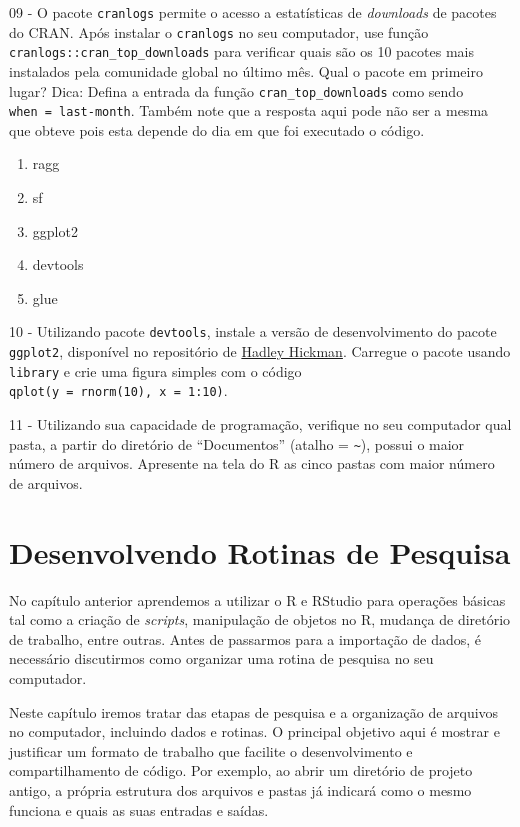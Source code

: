 \documentclass[
  11pt,
]{book}
\providecommand{\tightlist}{%
  \setlength{\itemsep}{0pt}\setlength{\parskip}{0pt}}
\begin{document}
09 -
O pacote \texttt{cranlogs} permite o acesso a estatísticas de \emph{downloads} de pacotes do CRAN. Após instalar o \texttt{cranlogs} no seu computador, use função \texttt{cranlogs::cran\_top\_downloads} para verificar quais são os 10 pacotes mais instalados pela comunidade global no último mês. Qual o pacote em primeiro lugar? Dica: Defina a entrada da função \texttt{cran\_top\_downloads} como sendo \texttt{when\ =\ \textquotesingle{}last-month\textquotesingle{}}. Também note que a resposta aqui pode não ser a mesma que obteve pois esta depende do dia em que foi executado o código.

\begin{enumerate}
\def\labelenumi{\alph{enumi})}
\tightlist
\item
  ragg
\item
  sf
\item
  ggplot2
\item
  devtools
\item
  glue
\end{enumerate}

10 -
Utilizando pacote \texttt{devtools}, instale a versão de desenvolvimento do pacote \texttt{ggplot2}, disponível no repositório de \href{https://github.com/hadley}{Hadley Hickman}. Carregue o pacote usando \texttt{library} e crie uma figura simples com o código \texttt{qplot(y\ =\ rnorm(10),\ x\ =\ 1:10)}.

11 -
Utilizando sua capacidade de programação, verifique no seu computador qual pasta, a partir do diretório de ``Documentos'' (atalho = \texttt{\textasciitilde{}}), possui o maior número de arquivos. Apresente na tela do R as cinco pastas com maior número de arquivos.

\hypertarget{scripts-pesquisa}{%
\chapter{Desenvolvendo Rotinas de Pesquisa}\label{scripts-pesquisa}}

No capítulo anterior aprendemos a utilizar o R e RStudio para operações básicas tal como a criação de \emph{scripts}, manipulação de objetos no R, mudança de diretório de trabalho, entre outras. Antes de passarmos para a importação de dados, é necessário discutirmos como organizar uma rotina de pesquisa no seu computador.

Neste capítulo iremos tratar das etapas de pesquisa e a organização de arquivos no computador, incluindo dados e rotinas. O principal objetivo aqui é mostrar e justificar um formato de trabalho que facilite o desenvolvimento e compartilhamento de código. Por exemplo, ao abrir um diretório de projeto antigo, a própria estrutura dos arquivos e pastas já indicará como o mesmo funciona e quais as suas entradas e saídas.
\end{document}
